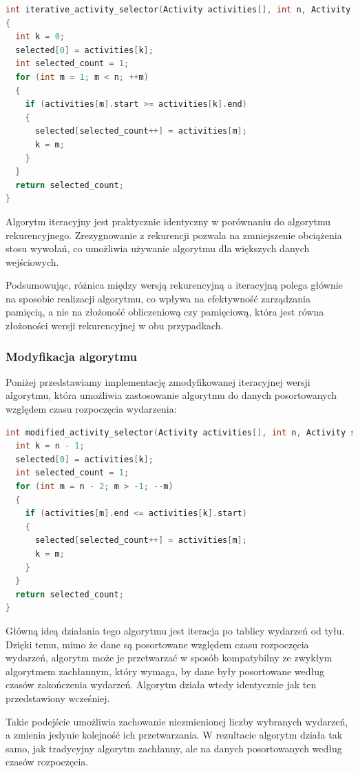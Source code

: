 \documentclass{article}
\begin{document}
\begin{lstlisting}[style=mystyle, language=C++, caption={Implementacja \texttt{greedy\_iterative\_activity\_selector}}, label={lst:iterative_activity_selector}]
int iterative_activity_selector(Activity activities[], int n, Activity selected[])
{
  int k = 0;
  selected[0] = activities[k];
  int selected_count = 1;
  for (int m = 1; m < n; ++m)
  {
    if (activities[m].start >= activities[k].end)
    {
      selected[selected_count++] = activities[m];
      k = m;
    }
  }
  return selected_count;
}
\end{lstlisting}
Algorytm iteracyjny jest praktycznie identyczny w porównaniu do algorytmu rekurencyjnego. Zrezygnowanie z rekurencji pozwala na zmniejszenie obciążenia stosu wywołań, co umożliwia używanie algorytmu dla większych danych wejściowych.

Podsumowując, różnica między wersją rekurencyjną a iteracyjną polega głównie na sposobie realizacji algorytmu, co wpływa na efektywność zarządzania pamięcią, a nie na złożoność obliczeniową czy pamięciową, która jest równa złożoności wersji rekurencyjnej w obu przypadkach.
\subsubsection{Modyfikacja algorytmu}
Poniżej przedstawiamy implementację zmodyfikowanej iteracyjnej wersji algorytmu, która umożliwia zastosowanie algorytmu do danych posortowanych względem czasu rozpoczęcia wydarzenia:
\begin{lstlisting}[style=mystyle, language=C++, caption={Implementacja \texttt{modified\_greedy\_iterative\_activity\_selector}}, label={lst:modified_iterative_activity_selector}]
int modified_activity_selector(Activity activities[], int n, Activity selected[]) {
  int k = n - 1;
  selected[0] = activities[k];
  int selected_count = 1;
  for (int m = n - 2; m > -1; --m)
  {
    if (activities[m].end <= activities[k].start)
    {
      selected[selected_count++] = activities[m];
      k = m;
    }
  }
  return selected_count;
}
\end{lstlisting}
Główną ideą działania tego algorytmu jest iteracja po tablicy wydarzeń od tyłu. Dzięki temu, mimo że dane są posortowane względem czasu rozpoczęcia wydarzeń, algorytm może je przetwarzać w sposób kompatybilny ze zwykłym algorytmem zachłannym, który wymaga, by dane były posortowane według czasów zakończenia wydarzeń. Algorytm działa wtedy identycznie jak ten przedstawiony wcześniej.

Takie podejście umożliwia zachowanie niezmienionej liczby wybranych wydarzeń, a zmienia jedynie kolejność ich przetwarzania. W rezultacie algorytm działa tak samo, jak tradycyjny algorytm zachłanny, ale na danych posortowanych według czasów rozpoczęcia.
\end{document}

